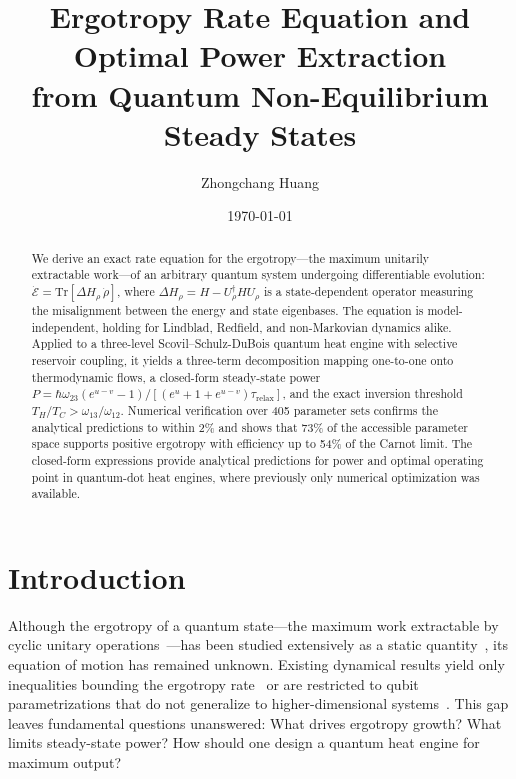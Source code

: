 \documentclass[prl,twocolumn,superscriptaddress,amsmath,amssymb]{revtex4-2}
\begin{document}
\title{Ergotropy Rate Equation and Optimal Power Extraction\\from Quantum Non-Equilibrium Steady States}

\author{Zhongchang Huang}

\date{\today}

\begin{abstract}
We derive an exact rate equation for the ergotropy---the maximum unitarily extractable work---of an arbitrary quantum system undergoing differentiable evolution: $\dot{\mathcal{E}} = \mathrm{Tr}[\Delta H_\rho \, \dot\rho]$, where $\Delta H_\rho = H - U_\rho^\dagger H U_\rho$ is a state-dependent operator measuring the misalignment between the energy and state eigenbases. The equation is model-independent, holding for Lindblad, Redfield, and non-Markovian dynamics alike. Applied to a three-level Scovil--Schulz-DuBois quantum heat engine with selective reservoir coupling, it yields a three-term decomposition mapping one-to-one onto thermodynamic flows, a closed-form steady-state power $P = \hbar\omega_{23}(e^{u-v}-1)/[(e^u+1+e^{u-v})\tau_{\mathrm{relax}}]$, and the exact inversion threshold $T_H/T_C > \omega_{13}/\omega_{12}$. Numerical verification over 405 parameter sets confirms the analytical predictions to within 2\% and shows that 73\% of the accessible parameter space supports positive ergotropy with efficiency up to 54\% of the Carnot limit. The closed-form expressions provide analytical predictions for power and optimal operating point in quantum-dot heat engines, where previously only numerical optimization was available.
\end{abstract}

\maketitle

\section{Introduction}

Although the ergotropy of a quantum state---the maximum work extractable by cyclic unitary operations~\cite{Allahverdyan2004}---has been studied extensively as a static quantity~\cite{Campaioli2024,Hadipour2025,Ahmadi2025,Lu2025}, its equation of motion has remained unknown. Existing dynamical results yield only inequalities bounding the ergotropy rate~\cite{Francica2020} or are restricted to qubit parametrizations that do not generalize to higher-dimensional systems~\cite{Choquehuanca2024}. This gap leaves fundamental questions unanswered: What drives ergotropy growth? What limits steady-state power? How should one design a quantum heat engine for maximum output?
\end{document}
